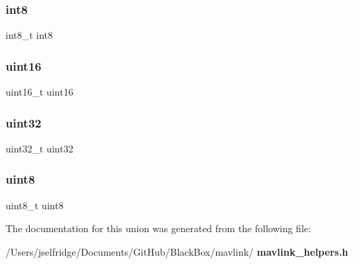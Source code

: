 \subsubsection{int8}
{\footnotesize\ttfamily int8\+\_\+t int8}

\mbox{\label{union____mavlink__bitfield_aedb868422c8a1ea1fdb3ea39ea6de1b9}} 
\subsubsection{uint16}
{\footnotesize\ttfamily uint16\+\_\+t uint16}

\mbox{\label{union____mavlink__bitfield_a5ad776be1fb768f3399aafcd1b58b3a2}} 
\subsubsection{uint32}
{\footnotesize\ttfamily uint32\+\_\+t uint32}

\mbox{\label{union____mavlink__bitfield_a41e2d0b297f5214535b655804a009618}} 
\subsubsection{uint8}
{\footnotesize\ttfamily uint8\+\_\+t uint8}



The documentation for this union was generated from the following file\+:\begin{DoxyCompactItemize}
\item 
/\+Users/jselfridge/\+Documents/\+Git\+Hub/\+Black\+Box/mavlink/\textbf{ mavlink\+\_\+helpers.\+h}\end{DoxyCompactItemize}
